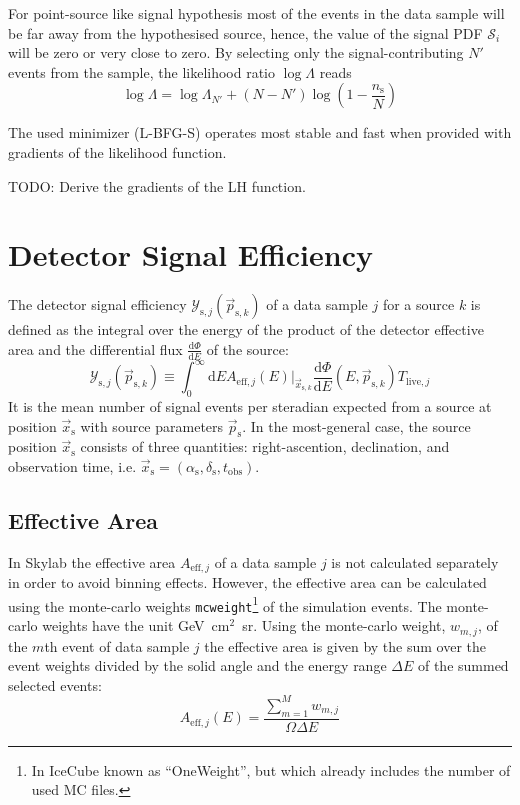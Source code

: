 \documentclass{article}
\newcommand{\code}[1]{\texttt{#1}}
\newcommand{\ns}{n_{\mathrm{s}}}
\newcommand{\ps}{\vec{p}_{\mathrm{s}}}
\newcommand{\psk}{\vec{p}_{\mathrm{s},k}}
\newcommand{\xs}{\vec{x}_{\mathrm{s}}}
\newcommand{\xsk}{\vec{x}_{\mathrm{s},k}}
\begin{document}
For point-source like signal hypothesis most of the events in the data sample
will be far away from the hypothesised source, hence, the value of the
signal PDF $\mathcal{S}_i$ will be zero or very close to zero. By selecting only
the signal-contributing $N'$ events from the sample, the likelihood ratio
$\log \Lambda$ reads
\begin{equation}
 \log \Lambda = \log \Lambda_{N'} + (N - N')\log(1 - \frac{\ns}{N})
\end{equation}

The used minimizer (L-BFG-S) operates most stable and fast when provided with
gradients of the likelihood function.

TODO: Derive the gradients of the LH function.

\section{Detector Signal Efficiency}

The detector signal efficiency $\mathcal{Y}_{\mathrm{s},j}(\psk)$
of a data sample $j$ for a source $k$ is defined as the integral over the energy
of the product of the detector effective area and the differential flux
$\frac{\mathrm{d}\Phi}{\mathrm{d}E}$ of the source:
\begin{equation}
 \mathcal{Y}_{\mathrm{s},j}(\psk) \equiv \int_0^\infty \mathrm{d}E A_{\mathrm{eff},j}(E)|_{\xsk} \frac{\mathrm{d}\Phi}{\mathrm{d}E}(E,\psk) T_{\mathrm{live},j}
\label{eq:Ysj}
\end{equation}
It is the mean number of signal events per steradian expected from a source at
position $\xs$ with source parameters $\ps$. In the most-general case,
the source position $\xs$ consists of three quantities: right-ascention,
declination, and observation time, i.e.
$\xs = (\alpha_{\mathrm{s}},\delta_{\mathrm{s}},t_{\mathrm{obs}})$.

\subsection{Effective Area}

In Skylab the effective area $A_{\mathrm{eff},j}$ of a data sample $j$ is not
calculated separately in order to avoid binning effects. However, the effective
area can be calculated using the monte-carlo weights \code{mcweight}\footnote{In IceCube
known as ``OneWeight'', but which already includes the number of used MC files.}
of the simulation events.
The monte-carlo weights have the unit GeV~cm$^2$~sr.
Using the monte-carlo weight, $w_{m,j}$, of the $m$th event of data sample $j$
the effective area is given by the sum over the event weights divided by the
solid angle and the energy range $\Delta E$ of the summed selected events:
\begin{equation}
 A_{\mathrm{eff},j}(E) = \frac{\sum_{m=1}^{M} w_{m,j}}{\Omega \Delta E}
\end{equation}
\end{document}
